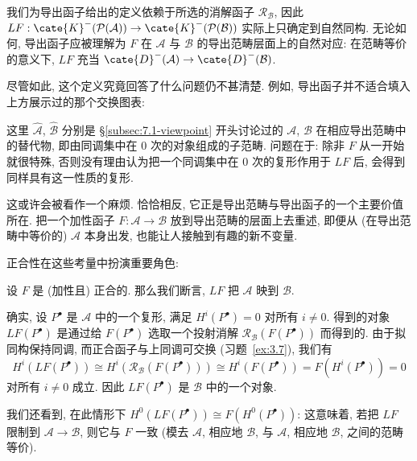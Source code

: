 我们为导出函子给出的定义依赖于所选的消解函子 $\mathcal{R}_{\mathcal{B}}$, 因此 $L F:\cate{K}^-(\mathcal{P}(\mathcal{A}))\to\cate{K}^-(\mathcal{P}(\mathcal{B}))$ 实际上只确定到自然同构. 无论如何, 导出函子应被理解为 $F$ 在 $\mathcal{A}$ 与 $\mathcal{B}$ 的导出范畴层面上的自然对应: 在范畴等价的意义下, $L F$ 充当 $\cate{D}^-(\mathcal{A})\to\cate{D}^-(\mathcal{B})$.

尽管如此, 这个定义究竟回答了什么问题仍不甚清楚. 例如, 导出函子并不适合填入上方展示过的那个交换图表:
\begin{center}
\end{center}
这里 $\widehat{\mathcal A}$, $\widehat{\mathcal B}$ 分别是 \S\ref{subsec:7.1-viewpoint} 开头讨论过的 $\mathcal{A}$, $\mathcal{B}$ 在相应导出范畴中的替代物, 即由同调集中在 $0$ 次的对象组成的子范畴. 问题在于: 除非 $F$ 从一开始就很特殊, 否则没有理由认为把一个同调集中在 $0$ 次的复形作用于 $L F$ 后, 会得到同样具有这一性质的复形.

这或许会被看作一个麻烦. 恰恰相反, 它正是导出范畴与导出函子的一个主要价值所在. 把一个加性函子 $F:\mathcal{A}\to\mathcal{B}$ 放到导出范畴的层面上去重述, 即便从 (在导出范畴中等价的) $\mathcal{A}$ 本身出发, 也能让人接触到有趣的新不变量.

正合性在这些考量中扮演重要角色:

\begin{example}\label{ex:7.2-exact-derived}
设 $F$ 是 (加性且) 正合的. 那么我们断言, $L F$ 把 $\mathscr{A}$ 映到 $\mathscr{B}$.

确实, 设 $P^\bullet$ 是 $\mathcal{A}$ 中的一个复形, 满足 $H^i(P^\bullet)=0$ 对所有 $i\neq 0$. 得到的对象 $L F(P^\bullet)$ 是通过给 $F(P^\bullet)$ 选取一个投射消解 $\mathcal{R}_{\mathcal{B}}(F(P^\bullet))$ 而得到的. 由于拟同构保持同调, 而正合函子与上同调可交换 (习题~\ref{ex:3.7}), 我们有
\[
H^i(L F(P^\bullet))\cong H^i(\mathcal{R}_{\mathcal{B}}(F(P^\bullet)))\cong H^i(F(P^\bullet))=F(H^i(P^\bullet))=0
\]
对所有 $i\neq 0$ 成立. 因此 $L F(P^\bullet)$ 是 $\mathscr{B}$ 中的一个对象.

我们还看到, 在此情形下 $H^0(L F(P^\bullet))\cong F(H^0(P^\bullet))$: 这意味着, 若把 $L F$ 限制到 $\mathcal{A}\to\mathcal{B}$, 则它与 $F$ 一致 (模去 $\mathcal{A}$, 相应地 $\mathcal{B}$, 与 $\mathscr{A}$, 相应地 $\mathscr{B}$, 之间的范畴等价).
\end{example}

